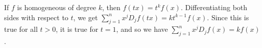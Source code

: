 \documentclass{hmwk}
\begin{document}
\begin{solution}

\pre If $f$ is homogeneous of degree $k$, then $f(tx) = t^kf(x)$. Differentiating both sides with respect to $t$, we get $\sum_{j=1}^n x^jD_jf(tx) = kt^{k-1}f(x)$. Since this is true for all $t > 0$, it is true for $t = 1$, and so we have $\sum_{j=1}^n x^jD_jf(x) = kf(x)$.
\end{solution}
\end{document}
